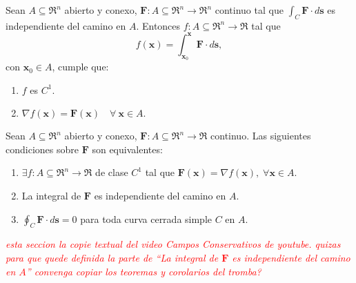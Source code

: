 \begin{theorem}
    Sean $A\subseteq\Re^n$ abierto y conexo, $\mathbf{F}:A\subseteq\Re^n\to\Re^n$ continuo tal que $\int_C \mathbf{F}\cdot d\mathbf{s}$ es independiente del camino en $A$. Entonces $f:A\subseteq\Re^n\to\Re$ tal que
    $$f(\mathbf{x})=\int_{\mathbf{x}_0}^{\mathbf{x}}\mathbf{F}\cdot d\mathbf{s},$$
    con $\mathbf{x}_0\in A$, cumple que: 
    \begin{enumerate}
        \item $f$ es $C^1$.
        \item $\nabla f(\mathbf{x})=\mathbf{F}(\mathbf{x})\quad\forall\:\mathbf{x}\in A.$\final
    \end{enumerate}
\end{theorem}

\begin{theorem}
    Sean $A\subseteq\Re^n$ abierto y conexo, $\mathbf{F}:A\subseteq\Re^n\to\Re$ continuo. Las siguientes condiciones sobre $\mathbf{F}$ son equivalentes:
    \begin{enumerate}
        \item $\exists f:A\subseteq\Re^n\to\Re$ de clase $C^1$ tal que $\mathbf{F}(\mathbf{x})=\nabla f(\mathbf{x}),\;\forall\mathbf{x}\in A.$ 
        \item La integral de $\mathbf{F}$ es independiente del camino en $A$.
        \item $\oint_C\mathbf{F}\cdot d\mathbf{s}=0$ para toda curva cerrada simple $C$ en $A$.\final
    \end{enumerate}
\end{theorem}

\textcolor{red}{\textit{esta seccion la copie textual del video Campos Conservativos de youtube. quizas para que quede definida la parte de ``La integral de $\mathbf{F}$ es independiente del camino en $A$'' convenga copiar los teoremas y corolarios del tromba?}}